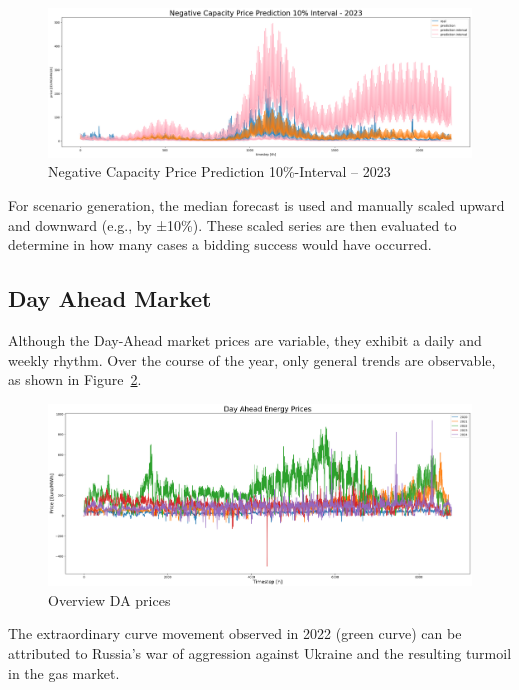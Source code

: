 \begin{figure}[H]
	\includegraphics[width=1\linewidth]{pictures/RL/Negative Capacity Price Prediction Interval - 2023.png}
	\caption{Negative Capacity Price Prediction 10\%-Interval – 2023}
	\label{fig:Negative Capacity Price Prediction Interval - 2023}
\end{figure}

For scenario generation, the median forecast is used and manually scaled upward and downward (e.g., by ±10\%).
These scaled series are then evaluated to determine in how many cases a bidding success would have occurred.


\subsection{Day Ahead Market}

Although the Day-Ahead market prices are variable, they exhibit a daily and weekly rhythm.
Over the course of the year, only general trends are observable, as shown in Figure~\ref{fig:overviewDAprices}.

\begin{figure}[!h]
	\includegraphics[width=1\linewidth]{pictures/overviewDAprices_year.png}
	\caption{Overview DA prices}
	\label{fig:overviewDAprices}
\end{figure}

The extraordinary curve movement observed in 2022 (green curve) can be attributed to
Russia's war of aggression against Ukraine and the resulting turmoil
in the gas market.

